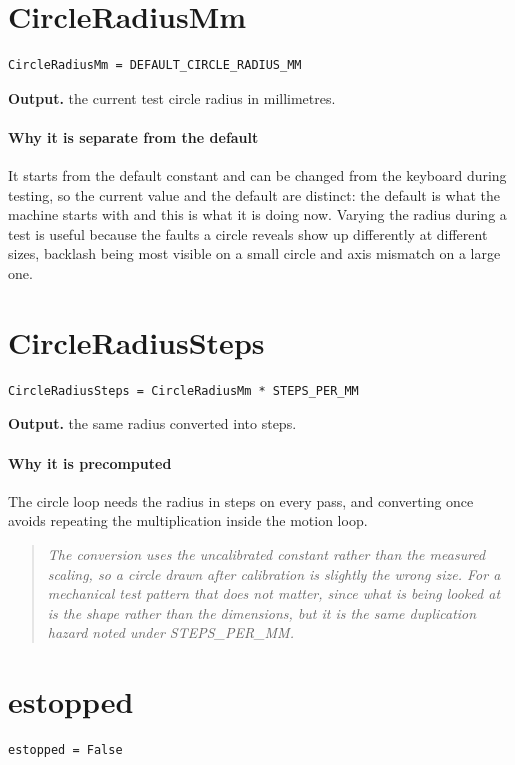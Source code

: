 \section{CircleRadiusMm}
\begin{lstlisting}[style=sig]
CircleRadiusMm = DEFAULT_CIRCLE_RADIUS_MM
\end{lstlisting}

\noindent\textbf{Output.} the current test circle radius in millimetres.


\paragraph{Why it is separate from the default}
It starts from the default constant and can be changed from the keyboard during testing, so the current value and the default are distinct: the default is what the machine starts with and this is what it is doing now. Varying the radius during a test is useful because the faults a circle reveals show up differently at different sizes, backlash being most visible on a small circle and axis mismatch on a large one.


\section{CircleRadiusSteps}
\begin{lstlisting}[style=sig]
CircleRadiusSteps = CircleRadiusMm * STEPS_PER_MM
\end{lstlisting}

\noindent\textbf{Output.} the same radius converted into steps.


\paragraph{Why it is precomputed}
The circle loop needs the radius in steps on every pass, and converting once avoids repeating the multiplication inside the motion loop.


\begin{quote}\small\itshape The conversion uses the uncalibrated constant rather than the measured scaling, so a circle drawn after calibration is slightly the wrong size. For a mechanical test pattern that does not matter, since what is being looked at is the shape rather than the dimensions, but it is the same duplication hazard noted under STEPS\_PER\_MM.\end{quote}

\section{estopped}
\begin{lstlisting}[style=sig]
estopped = False
\end{lstlisting}

